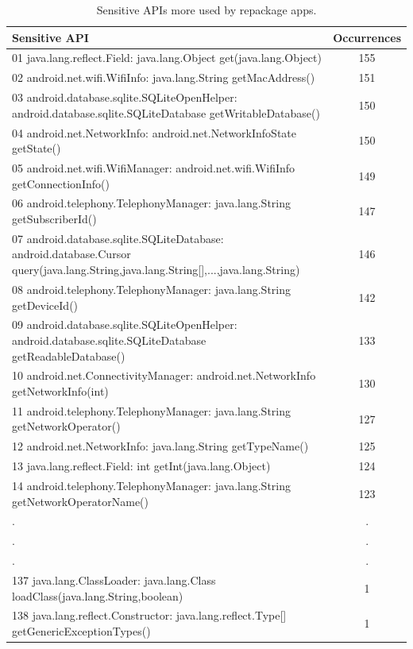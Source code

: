 \begin{table}[ht]
\caption{Sensitive APIs more used by repackage apps.}
\centering
  \begin{tabular}{lc}

    \toprule
    Sensitive API & Occurrences \\
    \midrule
    01 java.lang.reflect.Field: java.lang.Object get(java.lang.Object) &  155 \\
    02 android.net.wifi.WifiInfo: java.lang.String getMacAddress() &  151\\
    03 android.database.sqlite.SQLiteOpenHelper: android.database.sqlite.SQLiteDatabase getWritableDatabase() &  150 \\
    04 android.net.NetworkInfo: android.net.NetworkInfoState getState() &  150 \\
    05 android.net.wifi.WifiManager: android.net.wifi.WifiInfo getConnectionInfo() &  149 \\
    06 android.telephony.TelephonyManager: java.lang.String getSubscriberId() &  147 \\
    07 android.database.sqlite.SQLiteDatabase: android.database.Cursor query(java.lang.String,java.lang.String[],...,java.lang.String) &  146 \\
    08 android.telephony.TelephonyManager: java.lang.String getDeviceId() &  142 \\
   09 android.database.sqlite.SQLiteOpenHelper: android.database.sqlite.SQLiteDatabase getReadableDatabase() &  133 \\
    10 android.net.ConnectivityManager: android.net.NetworkInfo getNetworkInfo(int) &  130\\
    11 android.telephony.TelephonyManager: java.lang.String getNetworkOperator() &  127\\
    12 android.net.NetworkInfo: java.lang.String getTypeName() &  125\\
    13 java.lang.reflect.Field: int getInt(java.lang.Object) &  124 \\
    14 android.telephony.TelephonyManager: java.lang.String getNetworkOperatorName() &  123 \\
    .&  .\\
    .&  .\\
    .&  .\\
    137 java.lang.ClassLoader: java.lang.Class loadClass(java.lang.String,boolean) & 1 \\
    138 java.lang.reflect.Constructor: java.lang.reflect.Type[] getGenericExceptionTypes() & 1 \\

\hline
\end{tabular}
\label{tab:APIused}
\end{table}

